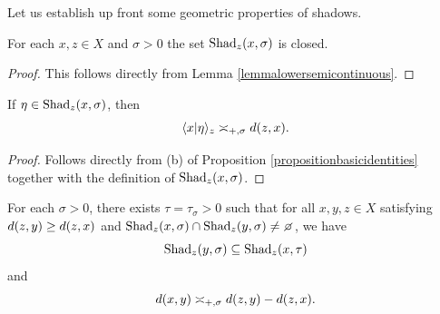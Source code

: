 Let us establish up front some geometric properties of shadows.

\begin{observation}
\label{observationshadowsclosed}
For each $x,z\in X$ and $\sigma > 0$ the set $\operatorname{Shad}_z(x,\sigma)$ is closed.
\end{observation}
\begin{proof}
This follows directly from Lemma \ref{lemmalowersemicontinuous}.
\end{proof}

\begin{observation}\label{observationmetricshadow}
If $\eta\in \operatorname{Shad}_z(x,\sigma)$, then
\[
\lb x|\eta\rb_z \asymp_{\plus,\sigma}%
 \dist(z,x).
\]
\end{observation}
\begin{proof}
Follows directly from (b) of Proposition \ref{propositionbasicidentities} together with the definition of $\operatorname{Shad}_z(x,\sigma)$.
\end{proof}





\begin{lemma}
\label{lemmatau}
For each $\sigma > 0$, there exists $\tau = \tau_\sigma > 0$ such that for all $x,y,z\in X$ satisfying $d(z,y)\geq d(z,x)$ and $\Shad_z(x,\sigma)\cap \Shad_z(y,\sigma)\neq\emptyset$, we have
\begin{equation}
\label{shadcontainment}
\operatorname{Shad}_z(y,\sigma) \subseteq\operatorname{Shad}_z(x,\tau)
\end{equation}
and
\begin{equation}
\label{distbusemann}
d(x,y) \asymp_{+,\sigma} d(z,y) - d(z,x).
\end{equation}
\end{lemma}

